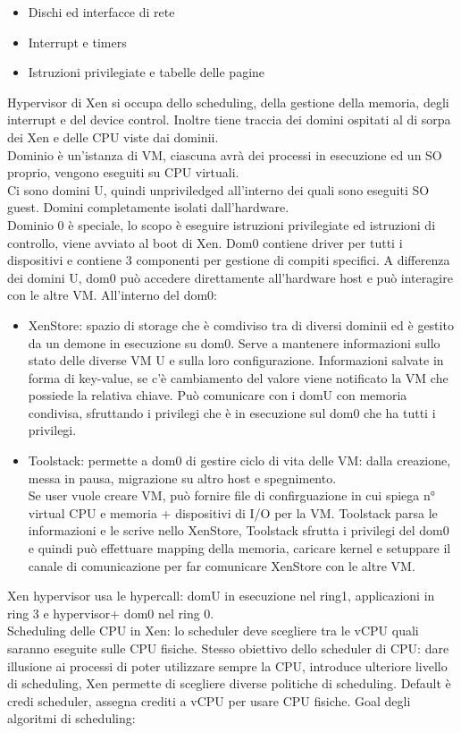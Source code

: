 \documentclass[16px]{article}
\begin{document}
\begin{itemize}
\item Dischi ed interfacce di rete
\item Interrupt e timers
\item Istruzioni privilegiate e tabelle delle pagine
\end{itemize}
Hypervisor di Xen si occupa dello scheduling, della gestione della memoria, degli interrupt e del device control. Inoltre tiene traccia dei domini ospitati al di sorpa dei Xen e delle CPU viste dai dominii.\\ Dominio è un'istanza di VM, ciascuna avrà dei processi in esecuzione ed un SO proprio, vengono eseguiti su CPU virtuali.\\ Ci sono domini U, quindi unpriviledged all'interno dei quali sono eseguiti SO guest. Domini completamente isolati dall'hardware.\\ Dominio 0 è speciale, lo scopo è eseguire istruzioni privilegiate ed istruzioni di controllo, viene avviato al boot di Xen. Dom0 contiene driver per tutti i dispositivi e contiene 3 componenti per gestione di compiti specifici. A differenza dei domini U, dom0 può accedere direttamente all'hardware host e può interagire con le altre VM. All'interno del dom0:
\begin{itemize}
\item XenStore: spazio di storage che è comdiviso tra di diversi dominii ed è gestito da un demone in esecuzione su dom0. Serve a mantenere  informazioni sullo stato delle diverse VM U e sulla loro configurazione. Informazioni salvate in forma di key-value, se c'è cambiamento del valore viene notificato la VM che possiede la relativa chiave. Può comunicare con i domU con memoria condivisa, sfruttando i privilegi che è in esecuzione sul dom0 che ha tutti i privilegi.
\item Toolstack: permette a dom0 di gestire ciclo di vita delle VM: dalla creazione, messa in pausa, migrazione su altro host e spegnimento.\\ Se user vuole creare VM, può fornire file di confirguazione in cui spiega n° virtual CPU e memoria + dispositivi di I/O per la VM. Toolstack parsa le informazioni e le scrive nello XenStore, Toolstack sfrutta i privilegi del dom0 e quindi può effettuare mapping della memoria, caricare kernel e setuppare il canale di comunicazione per far comunicare XenStore con le altre VM.
\end{itemize}
Xen hypervisor usa le hypercall: domU in esecuzione nel ring1, applicazioni in ring 3 e hypervisor+ dom0 nel ring 0.\\ Scheduling delle CPU in Xen: lo scheduler deve scegliere tra le vCPU quali saranno eseguite sulle CPU fisiche. Stesso obiettivo dello scheduler di CPU: dare illusione ai processi di poter utilizzare sempre la CPU, introduce ulteriore livello di scheduling, Xen permette di scegliere diverse politiche di scheduling. Default è credi scheduler, assegna crediti a vCPU per usare CPU fisiche. Goal degli algoritmi di scheduling: 
\end{document}
